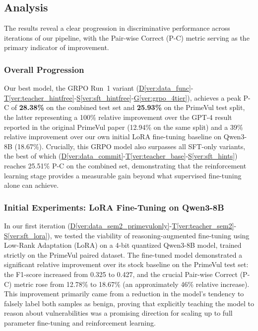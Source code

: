 \documentclass[12pt,a4paper]{article}
\newcommand{\vcode}[4]{\hyperref[#1]{D\ref*{#1}}-\hyperref[#2]{T\ref*{#2}}-\hyperref[#3]{S\ref*{#3}}-\hyperref[#4]{G\ref*{#4}}}
\newcommand{\vcodeSFT}[3]{\hyperref[#1]{D\ref*{#1}}-\hyperref[#2]{T\ref*{#2}}-\hyperref[#3]{S\ref*{#3}}}
\begin{document}
\subsection{Analysis}
\label{sec:analysis}

The results reveal a clear progression in discriminative performance across iterations of our pipeline, with the Pair-wise Correct (P-C) metric serving as the primary indicator of improvement.


\subsubsection{Overall Progression}

Our best model, the GRPO Run~1 variant (\vcode{ver:data_func}{ver:teacher_hintfree}{ver:sft_hintfree}{ver:grpo_4tier}), achieves a peak P-C of \textbf{28.38\%} on the combined test set and \textbf{25.93\%} on the PrimeVul test split, the latter representing a 100\% relative improvement over the GPT-4 result reported in the original PrimeVul paper (12.94\% on the same split) and a 39\% relative improvement over our own initial LoRA fine-tuning baseline on Qwen3-8B (18.67\%). Crucially, this GRPO model also surpasses all SFT-only variants, the best of which (\vcodeSFT{ver:data_commit}{ver:teacher_base}{ver:sft_hints}) reaches 25.51\% P-C on the combined set, demonstrating that the reinforcement learning stage provides a measurable gain beyond what supervised fine-tuning alone can achieve.

\subsubsection{Initial Experiments: LoRA Fine-Tuning on Qwen3-8B}
In our first iteration (\vcodeSFT{ver:data_sem2_primevulonly}{ver:teacher_sem2}{ver:sft_lora}), we tested the viability of reasoning-augmented fine-tuning using Low-Rank Adaptation (LoRA) on a 4-bit quantized Qwen3-8B model, trained strictly on the PrimeVul paired dataset. The fine-tuned model demonstrated a significant relative improvement over its stock baseline on the PrimeVul test set: the F1-score increased from 0.325 to 0.427, and the crucial Pair-wise Correct (P-C) metric rose from 12.78\% to 18.67\% (an approximately 46\% relative increase). This improvement primarily came from a reduction in the model's tendency to falsely label both samples as benign, proving that explicitly teaching the model to reason about vulnerabilities was a promising direction for scaling up to full parameter fine-tuning and reinforcement learning.
\end{document}
